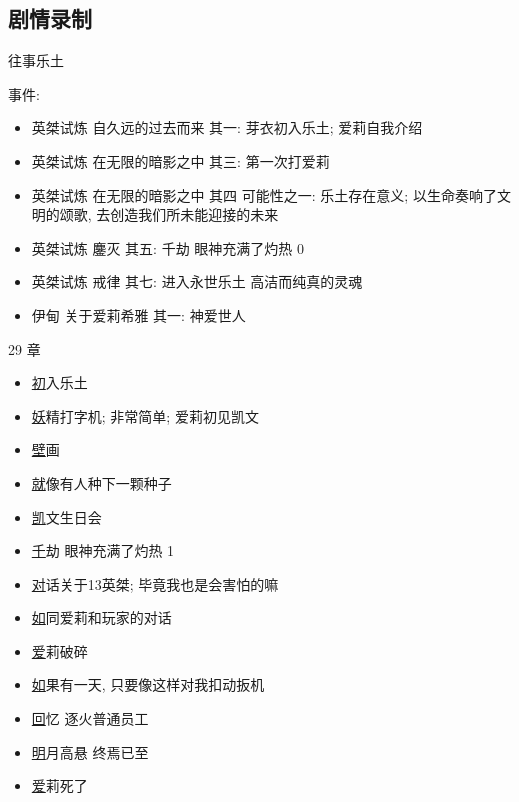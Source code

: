 \documentclass[a4paper]{article}
\begin{document}
\subsection{剧情录制}

往事乐土

事件:

\begin{itemize}
    \item 英桀试炼 自久远的过去而来 其一: 芽衣初入乐土; 爱莉自我介绍
    \item 英桀试炼 在无限的暗影之中 其三: 第一次打爱莉
    \item 英桀试炼 在无限的暗影之中 其四 可能性之一: 乐土存在意义; 以生命奏响了文明的颂歌, 去创造我们所未能迎接的未来
    \item 英桀试炼 鏖灭 其五: 千劫 眼神充满了灼热 0
    \item 英桀试炼 戒律 其七: 进入永世乐土 高洁而纯真的灵魂
    \item 伊甸 关于爱莉希雅 其一: 神爱世人
\end{itemize}

29 章

\begin{itemize}
    \item \href{https://www.bilibili.com/video/BV15Y4y1872S/} 初入乐土
    \item \href{https://www.bilibili.com/video/BV15Y4y1872S/?t=4118} 妖精打字机; 非常简单; 爱莉初见凯文
    \item \href{https://www.bilibili.com/video/BV15Y4y1872S/?t=5141} 壁画
    \item \href{https://www.bilibili.com/video/BV15Y4y1872S/?p=4&t=1114} 就像有人种下一颗种子
    \item \href{https://www.bilibili.com/video/BV15Y4y1872S/?p=4&t=1675} 凯文生日会
    \item \href{https://www.bilibili.com/video/BV15Y4y1872S/?p=4&t=3315} 千劫 眼神充满了灼热 1
    \item \href{https://www.bilibili.com/video/BV15Y4y1872S/?p=4&t=3830} 对话关于13英桀; 毕竟我也是会害怕的嘛
    \item \href{https://www.bilibili.com/video/BV15Y4y1872S/?p=4&t=4235} 如同爱莉和玩家的对话
    \item \href{https://www.bilibili.com/video/BV15Y4y1872S/?p=4&t=5700} 爱莉破碎
    \item \href{https://www.bilibili.com/video/BV15Y4y1872S/?p=5} 如果有一天, 只要像这样对我扣动扳机
    \item \href{https://www.bilibili.com/video/BV15Y4y1872S/?p=5&t=321} 回忆 逐火普通员工
    \item \href{https://www.bilibili.com/video/BV15Y4y1872S/?p=5&t=812} 明月高悬 终焉已至
    \item \href{https://www.bilibili.com/video/BV15Y4y1872S/?p=5&t=1445} 爱莉死了
\end{itemize}
\end{document}

